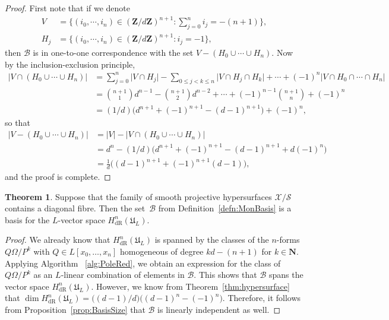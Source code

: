 \documentclass[a4paper,11pt]{article}
\numberwithin{equation}{section}
\providecommand{\abs}[1]{\lvert#1\rvert}                 %
\newcommand{\NN}{\mathbf{N}} %
\newcommand{\ZZ}{\mathbf{Z}} %
\providecommand{\HdR}{H_{\text{dR}}}    %
\providecommand{\cB}{\mathcal{B}} %
\theoremstyle{definition}
\newtheorem{thm}{Theorem}[section]
\begin{document}
\begin{proof}
First note that if we denote
\begin{align*}
V &= \{(i_0,\cdots,i_n) \in (\ZZ/d\ZZ)^{n+1} : \sum_{j=0}^n i_j = -(n+1)\}, \\
H_j &= \{(i_0,\cdots,i_n) \in (\ZZ/d\ZZ)^{n+1} : i_j = -1 \},
\end{align*}
then  $\cB$ is in one-to-one correspondence with the set $V-(H_0 \cup \cdots \cup H_n)$. Now by the inclusion-exclusion
principle, 
\begin{align*}
\abs{V \cap (H_0 \cup \cdots \cup H_n)} &= \sum_{j=0}^n \abs{V \cap H_j} - \sum_{0 \leq j < k \leq n} \abs{V \cap H_j \cap H_k}
+ \cdots + (-1)^{n} \abs{V \cap H_0 \cap \cdots \cap H_n} \\
&= {n+1 \choose 1} d^{n-1} -{n+1 \choose 2} d^{n-2} + \cdots + (-1)^{n-1} {n+1 \choose n} + (-1)^{n} \\
&= (1/d)\bigl(d^{n+1}+(-1)^{n+1} - (d-1)^{n+1}\bigr)+(-1)^n,
\end{align*}
so that
\begin{align*}
\abs{V-(H_0 \cup \cdots \cup H_n)}&=\abs{V}-\abs{V \cap (H_0 \cup \cdots \cup H_n)} \\
&= d^n - (1/d)\bigl(d^{n+1}+(-1)^{n+1} - (d-1)^{n+1}+d (-1)^n \bigr) \\
&= \frac{1}{d} \bigl((d-1)^{n+1} + (-1)^{n+1}(d-1) \bigr),
\end{align*}
and the proof is complete.
\end{proof}

\begin{thm} \label{thm:Basis}
Suppose that the family of smooth projective hypersurfaces $\mathcal{X}/\mathcal{S}$ 
contains a diagonal fibre.  Then the set~$\cB$ from Definition~\ref{defn:MonBasis} 
is a basis for the $L$-vector space $\HdR^n(\mathfrak{U}_L)$.
\end{thm}

\begin{proof}
We already know that $\HdR^n(\mathfrak{U}_L)$ is spanned by the classes of the 
$n$-forms $Q \Omega / P^k$ with $Q \in L[x_0, \dotsc, x_n]$ homogeneous of degree 
$kd - (n+1)$ for $k \in \NN$. Applying Algorithm ~\ref{alg:PoleRed}, we obtain an 
expression for the class of $Q \Omega / P^k$ as an $L$-linear combination of 
elements in $\cB$.  This shows that $\cB$ spans the vector space 
$\HdR^n(\mathfrak{U}_L)$. However, we know from Theorem~\ref{thm:hypersurface} that 
$\dim \HdR^n(\mathfrak{U}_L) = \bigl((d-1)/d\bigr) \bigl( (d-1)^n - (-1)^n \bigr)$.  
Therefore, it follows from Proposition~\ref{prop:BasisSize} that $\cB$ is linearly 
independent as well.
\end{proof}
\end{document}
